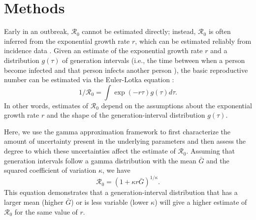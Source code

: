 \documentclass[12pt]{article}
\begin{document}
\section{Methods}

Early in an outbreak, $\mathcal R_0$ cannot be estimated directly;
instead, $\mathcal R_0$ is often inferred from
the exponential growth rate $r$, which can be estimated reliably from incidence data \citep{chowell2003sars, mills2004transmissibility, nishiura2009transmission, nishiura2010pros, ma2014estimating}.
Given an estimate of the exponential growth rate $r$ and a distribution $g(\tau)$ of
generation intervals (i.e., the time between when a person become 
infected and that person infects another person \citep{svensson2007note}), the basic reproductive
number can be estimated via the Euler-Lotka equation \citep{wallinga2007generation}:
\begin{equation}
1/\mathcal R_0 = \int \exp(-r\tau) g(\tau) d\tau.
\end{equation}
In other words, estimates of $\mathcal R_0$
depend on the assumptions about the
exponential growth rate $r$ and the shape of the generation-interval distribution $g(\tau)$.

Here, we use the gamma approximation framework \citep{park2019practical} to first characterize the
amount of uncertainty present in the underlying parameters and then assess the 
degree to which these uncertainties
affect the estimate of $\mathcal R_0$.
Assuming that generation intervals follow a gamma distribution 
with the mean $\bar G$ and the squared coefficient of variation $\kappa$, 
we have
\begin{equation}
\mathcal R_0 = \left(1 + \kappa r \bar{G}\right)^{1/\kappa}.
\label{eq:gamma}
\end{equation}
This equation demonstrates that a generation-interval distribution
that has a larger mean (higher $\bar{G}$) or is less variable (lower $\kappa$)
will give a higher estimate of $\mathcal R_0$ for the same value of $r$.
\end{document}
